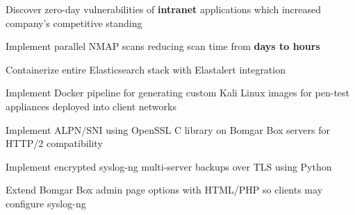 \documentclass{deedy-resume-openfont}
\begin{document}
\begin{minipage}[t]{0.64 \textwidth}
	\begin{tightemize}
		\item Discover zero-day vulnerabilities of \textbf{intranet} applications which increased company's competitive standing
		\item Implement parallel NMAP scans reducing scan time from \textbf{days to hours}
		\item Containerize entire Elasticsearch stack with Elastalert integration
		\item Implement Docker pipeline for generating custom Kali Linux images for pen-test appliances deployed into client networks
	\end{tightemize}
	\sectionsep
																																																																		
	\begin{tightemize}
		\item Implement ALPN/SNI using OpenSSL C library on Bomgar Box servers for HTTP/2 compatibility
		\item Implement encrypted syslog-ng multi-server backups over TLS using Python
		\item Extend Bomgar Box admin page options with HTML/PHP so clients may configure syslog-ng
	\end{tightemize}
	\sectionsep
\end{minipage}
\hfill
\end{document}
